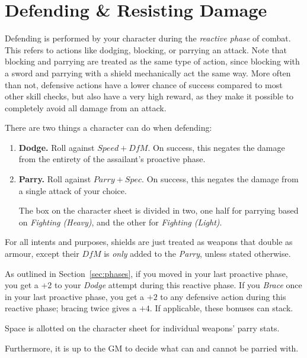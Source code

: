 \section{Defending \& Resisting Damage}\label{sec:defence}
Defending is performed by your character during the \textit{reactive phase} of combat.
This refers to actions like dodging, blocking, or parrying an attack.
Note that blocking and parrying are treated as the same type of action, since blocking with a sword and parrying with a shield mechanically act the same way.
More often than not, defensive actions have a lower chance of success compared to most other skill checks, but also have a very high reward, as they make it possible to completely avoid all damage from an attack.

There are two things a character can do when defending:
\begin{enumerate}
    \item \textbf{Dodge.} 
        Roll against $\mathit{Speed} + \mathit{DfM}$.
        On success, this negates the damage from the entirety of the assailant's proactive phase.
    \item \textbf{Parry.} 
        Roll against $Parry + Spec.$
        On success, this negates the damage from a single attack of your choice.

        The box on the character sheet is divided in two, one half for parrying based on \textit{Fighting (Heavy)}, and the other for \textit{Fighting (Light)}.
\end{enumerate}
For all intents and purposes, shields are just treated as weapons that double as armour, except their $\mathit{DfM}$ is \textit{only} added to the \textit{Parry}, unless stated otherwise.

\begin{note} 
    As outlined in Section~\ref{sec:phases}, if you moved in your last proactive phase, you get a +2 to your \textit{Dodge} attempt during this reactive phase. 
    If you \textit{Brace} once in your last proactive phase, you get a $+2$ to any defensive action during this reactive phase; bracing twice gives a $+4$. 
    If applicable, these bonuses can stack.
\end{note}

\begin{note} 
    Space is allotted on the character sheet for individual weapons' parry stats.

    Furthermore, it is up to the GM to decide what can and cannot be parried with.
\end{note}


